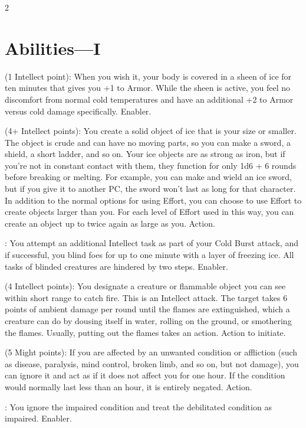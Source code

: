 \begin{multicols}{2}

\section{Abilities—I}

 (1 Intellect point): When you wish it, your body is covered in a sheen of ice for ten minutes that gives you +1 to Armor. While the sheen is active, you feel no discomfort from normal cold temperatures and have an additional +2 to Armor versus cold damage specifically. Enabler. 
 
 (4+ Intellect points): You create a solid object of ice that is your size or smaller. The object is crude and can have no moving parts, so you can make a sword, a shield, a short ladder, and so on. Your ice objects are as strong as iron, but if you’re not in constant contact with them, they function for only 1d6 + 6 rounds before breaking or melting. For example, you can make and wield an ice sword, but if you give it to another PC, the sword won’t last as long for that character. In addition to the normal options for using Effort, you can choose to use Effort to create objects larger than you. For each level of Effort used in this way, you can create an object up to twice again as large as you. Action. 
 
: You attempt an additional Intellect task as part of your Cold Burst attack, and if successful, you blind foes for up to one minute with a layer of freezing ice. All tasks of blinded creatures are hindered by two steps. Enabler. 
 
 (4 Intellect points): You designate a creature or flammable object you can see within short range to catch fire. This is an Intellect attack. The target takes 6 points of ambient damage per round until the flames are extinguished, which a creature can do by dousing itself in water, rolling on the ground, or smothering the flames. Usually, putting out the flames takes an action. Action to initiate. 
 
 (5 Might points): If you are affected by an unwanted condition or affliction (such as disease, paralysis, mind control, broken limb, and so on, but not damage), you can ignore it and act as if it does not affect you for one hour. If the condition would normally last less than an hour, it is entirely negated. Action.
 
: You ignore the impaired condition and treat the debilitated condition as impaired. Enabler. 
 

\end{multicols}
